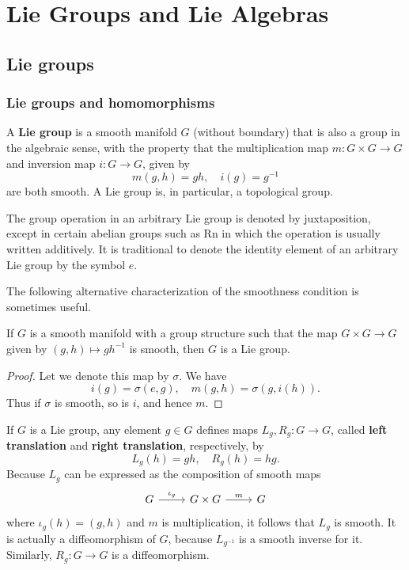 \chapter{Lie Groups and Lie Algebras}
\section{Lie groups}
\subsection{Lie groups and homomorphisms}
A \textbf{Lie group} is a smooth manifold $G$ (without boundary) that is also a group in the algebraic sense, with the property that the multiplication map $m:G\times G\to G$ and inversion map $i:G\to G$, given by
\[m(g,h)=gh,\quad i(g)=g^{-1}\]
are both smooth. A Lie group is, in particular, a topological group. \par
The group operation in an arbitrary Lie group is denoted by juxtaposition, except in certain abelian groups such as Rn in which the operation is usually written additively. It is traditional to denote the identity element of an arbitrary Lie group by the symbol $e$.\par
The following alternative characterization of the smoothness condition is sometimes useful.
\begin{proposition}
If $G$ is a smooth manifold with a group structure such that the map $G\times G\to G$ given by $(g,h)\mapsto gh^{-1}$ is smooth, then $G$ is a Lie group.
\end{proposition}
\begin{proof}
Let we denote this map by $\sigma$. We have
\[i(g)=\sigma(e,g),\quad m(g,h)=\sigma(g,i(h)).\]
Thus if $\sigma$ is smooth, so is $i$, and hence $m$.
\end{proof}
If $G$ is a Lie group, any element $g\in G$ defines maps $L_g,R_g:G\to G$, called \textbf{left translation} and \textbf{right translation}, respectively, by
\[L_g(h)=gh,\quad R_g(h)=hg.\]
Because $L_g$ can be expressed as the composition of smooth maps
\[\begin{tikzcd}
G\ar[r,"\iota_g"]&G\times G\ar[r,"m"]&G
\end{tikzcd}\]
where $\iota_g(h)=(g,h)$ and $m$ is multiplication, it follows that $L_g$ is smooth. It is actually a diffeomorphism of $G$, because $L_{g^{-1}}$ is a smooth inverse for it. Similarly,
$R_g:G\to G$ is a diffeomorphism.
